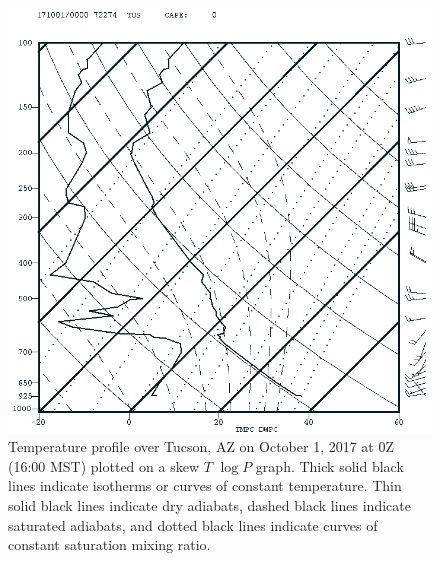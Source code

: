\documentclass[11pt]{article}
\begin{document}
\begin{figure}[h!]
  \centering
  \includegraphics[width=\textwidth]{TUSTempProfile0Z.png}
  \caption{Temperature profile over Tucson, AZ on October 1, 2017 at 0Z (16:00 MST) plotted on a skew $T$ $\log P$ graph. Thick solid black lines indicate isotherms or curves of constant temperature. Thin solid black lines indicate dry adiabats, dashed black lines indicate saturated adiabats, and dotted black lines indicate curves of constant saturation mixing ratio.}
  \label{fig:TUS0Z}
\end{figure}
\end{document}

